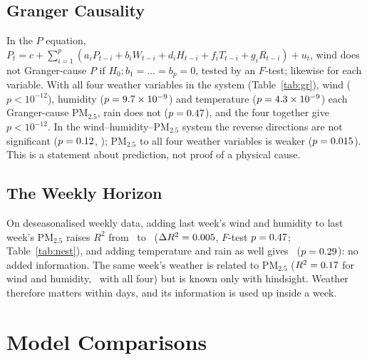 \documentclass[11pt,a4paper,twoside,twocolumn]{extarticle}
\newcommand{\pmtwo}{PM$_{2.5}$}
\begin{document}
\subsection{Granger Causality}
In the $P$ equation, $P_t=c+\sum_{i=1}^{p}(a_iP_{t-i}+b_iW_{t-i}+d_iH_{t-i}+f_iT_{t-i}+g_iR_{t-i})+u_t$, wind does not Granger-cause $P$ \cite{granger} if $H_0:b_1=\dots=b_p=0$, tested by an $F$-test; likewise for each variable. With all four weather variables in the system (Table~\ref{tab:gr}), wind ($p<10^{-12}$), humidity ($p=9.7\times10^{-9}$) and temperature ($p=4.3\times10^{-9}$) each Granger-cause \pmtwo{}, rain does not ($p=0.47$), and the four together give $p<10^{-12}$. In the wind--humidity--\pmtwo{} system the reverse directions are not significant ($p=0.12$, \gRevRhP); \pmtwo{} to all four weather variables is weaker ($p=0.015$). This is a statement about prediction, not proof of a physical cause.
\begin{table}[t]\centering\small{}\caption{Granger $F$-tests, daily anomalies 2015--19.}\label{tab:gr}\end{table}
\subsection{The Weekly Horizon}
On deseasonalised weekly data, adding last week's wind and humidity to last week's \pmtwo{} raises $R^2$ from \nestRone\ to \nestRtwo\ ($\Delta R^2=0.005$, $F$-test $p=0.47$; Table~\ref{tab:nest}), and adding temperature and rain as well gives \nestRfour\ ($p=0.29$): no added information. The same week's weather is related to \pmtwo{} ($R^2=0.17$ for wind and humidity, \nestRsameFour\ with all four) but is known only with hindsight. Weather therefore matters within days, and its information is used up inside a week.
\begin{table}[t]\centering\small{}\caption{Weekly regression of deseasonalised \pmtwo{}.}\label{tab:nest}\end{table}

\section{Model Comparisons}
\end{document}
